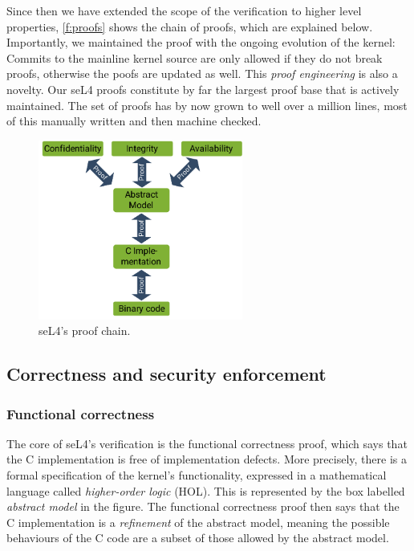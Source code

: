 \documentclass[english,a4paper,12pt\ifDraft,draft\fi]{report}
\newcommand{\SSect}[1]{\subsection{#1}}
\newcommand{\SSSect}[1]{\subsubsection*{#1}}
\newcommand{\SSect}[1]{\section{#1}}
\newcommand{\SSSect}[1]{\subsection*{#1}}
\begin{document}
  Since then we have extended the scope of the verification to higher
  level properties, \autoref{f:proofs} shows the chain of proofs,
  which are explained below. Importantly, we maintained the proof with the
  ongoing evolution of the kernel: Commits to the mainline kernel
  source are only allowed if they do not break proofs, otherwise the poofs
  are updated as well. This \emph{proof engineering} is also a
  novelty. Our seL4 proofs constitute by
  far the largest proof base that is actively maintained. The set of proofs has by
  now grown to well over a million lines, most of this manually
  written and then machine checked.

  \begin{figure}[bh]
    \centering
    \includegraphics[width=0.6\textwidth]{proofs}
    \caption{seL4's proof chain.}
    \label{f:proofs}
  \end{figure}

  \SSect{Correctness and security enforcement}

  \SSSect{Functional correctness}

  The core of seL4's verification is the functional correctness proof, which says that the
  C implementation is free of implementation defects.
  More precisely, there is a formal
  specification of the kernel's functionality, expressed in a
  mathematical language called \emph{higher-order logic} (HOL). This
  is represented by the box labelled \emph{abstract model} in the
  figure. The functional correctness proof then says that the C
  implementation is a \emph{refinement} of the abstract model, meaning
  the possible behaviours of the C code are a subset of those allowed by the
  abstract model.
\end{document}
